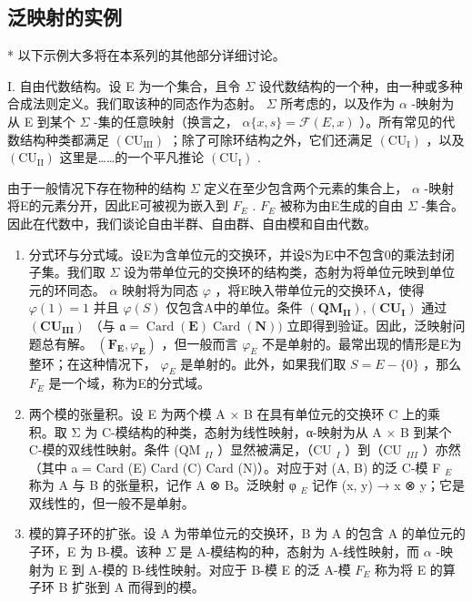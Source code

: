 \subsection{泛映射的实例}

* 以下示例大多将在本系列的其他部分详细讨论。

I. 自由代数结构。设 E 为一个集合，且令 \(\Sigma\) 设代数结构的一个种，由一种或多种合成法则定义。我们取该种的同态作为态射。 \(\Sigma\) 所考虑的，以及作为 \(\alpha\) -映射为从 E 到某个 \(\Sigma\) -集的任意映射（换言之， \(\alpha\{x, s\} = \mathcal{F}(E, x)\) ）。所有常见的代数结构种类都满足 \((\mathrm{CU}_{\mathrm{III}})\) ；除了可除环结构之外，它们还满足 \((\mathrm{CU}_{\mathrm{I}})\) ，以及 \((\mathrm{CU}_{\mathrm{II}})\) 这里是……的一个平凡推论 \((\mathrm{CU}_{\mathrm{I}})\) .

由于一般情况下存在物种的结构 \(\Sigma\) 定义在至少包含两个元素的集合上， \(\alpha\) -映射将E的元素分开，因此E可被视为嵌入到 \(F_{E}\) . \(F_{E}\) 被称为由E生成的自由 \(\Sigma\) -集合。因此在代数中，我们谈论自由半群、自由群、自由模和自由代数。

\begin{enumerate}
\def\labelenumi{\Roman{enumi}.}
\setcounter{enumi}{1}
\item
  分式环与分式域。设E为含单位元的交换环，并设S为E中不包含0的乘法封闭子集。我们取 \(\Sigma\) 设为带单位元的交换环的结构类，态射为将单位元映到单位元的环同态。 \(\alpha\) 映射将为同态 \(\varphi\) ，将E映入带单位元的交换环A，使得 \(\varphi(1)=1\) 并且 \(\varphi(S)\) 仅包含A中的单位。条件 \((\mathbf{Q}\mathbf{M}_{\mathbf{II}}), (\mathbf{C}\mathbf{U}_{\mathbf{I}})\) 通过 \((\mathbf{C}\mathbf{U}_{\mathbf{III}})\) （与 \(\mathfrak{a}=\operatorname{Card}(\mathbf{E})\operatorname{Card}(\mathbf{N}))\) 立即得到验证。因此，泛映射问题总有解。 \((\mathbf{F}_{\mathbf{E}},\varphi_{\mathbf{E}})\) ，但一般而言 \(\varphi_{E}\) 不是单射的。最常出现的情形是E为整环；在这种情况下， \(\varphi_{E}\) 是单射的。此外，如果我们取 \(S = E - \{0\}\) ，那么 \(F_{E}\) 是一个域，称为E的分式域。
\item
  两个模的张量积。设 E 为两个模 A × B 在具有单位元的交换环 C 上的乘积。取 Σ 为 C-模结构的种类，态射为线性映射，α-映射为从 A × B 到某个 C-模的双线性映射。条件 (QM \(_{II}\) ）显然被满足，（CU \(_{I}\) ）到（CU \(_{III}\) ）亦然（其中 a = Card (E) Card (C) Card (N)）。对应于对 (A, B) 的泛 C-模 F \(_{E}\) 称为 A 与 B 的张量积，记作 A ⊗ B。泛映射 φ \(_{E}\) 记作 (x, y) → x ⊗ y；它是双线性的，但一般不是单射。
\item
  模的算子环的扩张。设 A 为带单位元的交换环，B 为 A 的包含 A 的单位元的子环，E 为 B-模。该种 \(\Sigma\) 是 A-模结构的种，态射为 A-线性映射，而 \(\alpha\) -映射为 E 到 A-模的 B-线性映射。对应于 B-模 E 的泛 A-模 \(F_{E}\) 称为将 E 的算子环 B 扩张到 A 而得到的模。
\end{enumerate}

